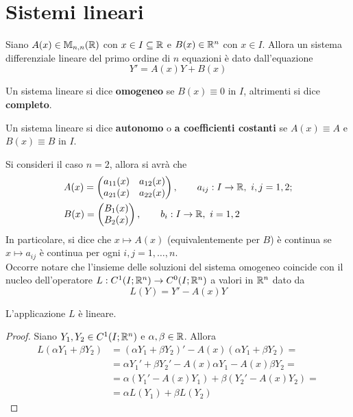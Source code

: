 \section{Sistemi lineari}
Siano $A(x) \in \mathbb{M}_{n,n}(\mathbb{R})$ con $x \in I \subseteq \mathbb{R}$ e $B(x) \in \mathbb{R}^n$ con $x \in I$. Allora un sistema differenziale lineare del primo ordine di $n$ equazioni è dato dall'equazione 
\begin{equation*}
    Y'=A(x)Y+B(x)
\end{equation*}
\begin{definition}
    Un sistema lineare si dice \textbf{omogeneo} se $B(x) \equiv 0$ in $I$, altrimenti si dice \textbf{completo}.
\end{definition}
\begin{definition}
    Un sistema lineare si dice \textbf{autonomo} o \textbf{a coefficienti costanti} se $A(x) \equiv A$ e $B(x) \equiv B$ in $I$.
\end{definition}
Si consideri il caso $n=2$, allora si avrà che
\begin{align}
    &A(x)=\begin{pmatrix}
        a_{11}(x) & a_{12}(x)\\
        a_{21}(x) & a_{22}(x)
    \end{pmatrix}, \qquad a_{ij}: I \to \mathbb{R},\ i, j=1,2;\\
    &B(x)=\begin{pmatrix}
        B_1(x)\\
        B_2(x)
    \end{pmatrix}, \qquad b_i:I \to \mathbb{R},\ i=1,2 
\end{align}
In particolare, si dice che $x \mapsto A(x)$ (equivalentemente per $B$) è continua se $x \mapsto a_{ij}$ è continua per ogni $i, j= 1, \dots, n$.\\
Occorre notare che l'insieme delle soluzioni del sistema omogeneo coincide con il nucleo dell'operatore $L:C^1(I; \mathbb{R}^n) \to C^0(I; \mathbb{R}^n)$ a valori in $\mathbb{R}^n$ dato da
    \begin{equation} \label{Eq: Applicazione L}
        L(Y)=Y'-A(x)Y
    \end{equation}
\begin{proposition}
    L'applicazione $L$
    è lineare.
\end{proposition}
\begin{proof}
    Siano $Y_1, Y_2 \in C^1(I; \mathbb{R}^n)$ e $\alpha, \beta \in \mathbb{R}$. Allora
    \begin{equation*}
        \begin{aligned}
            L(\alpha Y_1 + \beta Y_2) &= (\alpha Y_1+ \beta Y_2)'- A(x)(\alpha Y_1 + \beta Y_2) =\\
            &= \alpha Y_1'+ \beta Y_2' - A(x) \alpha Y_1 - A(x) \beta Y_2=\\
            &=\alpha(Y_1'-A(x)Y_1)+ \beta (Y_2'-A(x)Y_2)=\\
            &=\alpha L(Y_1)+\beta L(Y_2)
        \end{aligned}
    \end{equation*}
\end{proof}

